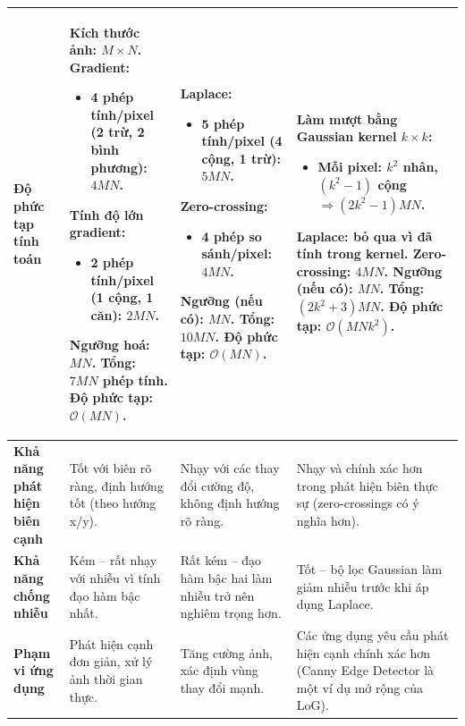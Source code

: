 \documentclass[12pt]{article}
\begin{document}
\begin{longtable}{>{\raggedright}p{3.5cm} | >{\raggedright}p{3.5cm} | >{\raggedright}p{3.5cm} | >{\raggedright\arraybackslash}p{3.5cm}}
	
	\textbf{Độ phức tạp tính toán} &
	Kích thước ảnh: \(M \times N\).
	Gradient:
	\begin{itemize}
	\item 4 phép tính/pixel (2 trừ, 2 bình phương): \(4MN\).
	\end{itemize}
	Tính độ lớn gradient:
	\begin{itemize}
	\item 2 phép tính/pixel (1 cộng, 1 căn): \(2MN\).
	\end{itemize}
	Ngưỡng hoá: \(MN\).
	Tổng: \(7MN\) phép tính. Độ phức tạp: \(\mathcal{O}(MN)\).
	&
	Laplace:
	\begin{itemize}
	\item 5 phép tính/pixel (4 cộng, 1 trừ): \(5MN\).
	\end{itemize}
	Zero-crossing:
	\begin{itemize}
	\item 4 phép so sánh/pixel: \(4MN\).
	\end{itemize}
	Ngưỡng (nếu có): \(MN\).
	Tổng: \(10MN\). Độ phức tạp: \(\mathcal{O}(MN)\).
	&
	Làm mượt bằng Gaussian kernel \(k \times k\):
	\begin{itemize}
	\item Mỗi pixel: \(k^2\) nhân, \((k^2 - 1)\) cộng \( \Rightarrow (2k^2 - 1)MN\).
	\end{itemize}
	Laplace: bỏ qua vì đã tính trong kernel.
	Zero-crossing: \(4MN\).
	Ngưỡng (nếu có): \(MN\).
	Tổng: \((2k^2 + 3)MN\). Độ phức tạp: \(\mathcal{O}(MNk^2)\).
	\\
	\midrule
	
	\textbf{Khả năng phát hiện biên cạnh} & Tốt với biên rõ ràng, định hướng tốt (theo hướng x/y). & Nhạy với các thay đổi cường độ, không định hướng rõ ràng. & Nhạy và chính xác hơn trong phát hiện biên thực sự (zero-crossings có ý nghĩa hơn). \\
	\midrule
	
	\textbf{Khả năng chống nhiễu} & Kém – rất nhạy với nhiễu vì tính đạo hàm bậc nhất. & Rất kém – đạo hàm bậc hai làm nhiễu trở nên nghiêm trọng hơn. & Tốt – bộ lọc Gaussian làm giảm nhiễu trước khi áp dụng Laplace. \\
	\midrule
	
	\textbf{Phạm vi ứng dụng} & Phát hiện cạnh đơn giản, xử lý ảnh thời gian thực. & Tăng cường ảnh, xác định vùng thay đổi mạnh. & Các ứng dụng yêu cầu phát hiện cạnh chính xác hơn (Canny Edge Detector là một ví dụ mở rộng của LoG). \\
	\bottomrule
	\end{longtable}
	
\end{document}
